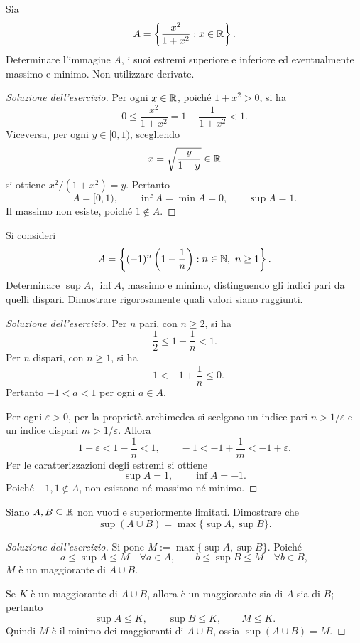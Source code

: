 \begin{exercise}
\label{ex:fondamenti-estremi-immagine-razionale}
Sia
\[
  A=\left\{\frac{x^2}{1+x^2}:x\in\mathbb{R}\right\}.
\]
Determinare l'immagine $A$, i suoi estremi superiore e inferiore
ed eventualmente massimo e minimo. Non utilizzare derivate.
\end{exercise}
\begin{proof}[Soluzione dell'esercizio]
Per ogni $x\in\mathbb{R}$, poiché $1+x^2>0$, si ha
\[
  0\le\frac{x^2}{1+x^2}
    =1-\frac1{1+x^2}<1.
\]
Viceversa, per ogni $y\in[0,1)$, scegliendo
\[
  x=\sqrt{\frac{y}{1-y}}\in\mathbb{R}
\]
si ottiene $x^2/(1+x^2)=y$. Pertanto
\[
  A=[0,1),\qquad \inf A=\min A=0,\qquad \sup A=1.
\]
Il massimo non esiste, poiché $1\notin A$.
\end{proof}

\begin{exercise}
\label{ex:fondamenti-estremi-famiglia-alterna}
Si consideri
\[
  A=\left\{(-1)^n\left(1-\frac1n\right):
    n\in\mathbb{N},\ n\ge1\right\}.
\]
Determinare $\sup A$, $\inf A$, massimo e minimo,
distinguendo gli indici pari da quelli dispari.
Dimostrare rigorosamente quali valori siano raggiunti.
\end{exercise}
\begin{proof}[Soluzione dell'esercizio]
Per $n$ pari, con $n\ge2$, si ha
\[
  \frac12\le1-\frac1n<1.
\]
Per $n$ dispari, con $n\ge1$, si ha
\[
  -1<-1+\frac1n\le0.
\]
Pertanto $-1<a<1$ per ogni $a\in A$.

Per ogni $\varepsilon>0$, per la proprietà archimedea
si scelgono un indice pari $n>1/\varepsilon$
e un indice dispari $m>1/\varepsilon$. Allora
\[
  1-\varepsilon<1-\frac1n<1,
  \qquad
  -1<-1+\frac1m<-1+\varepsilon.
\]
Per le caratterizzazioni degli estremi si ottiene
\[
  \sup A=1,\qquad \inf A=-1.
\]
Poiché $-1,1\notin A$, non esistono né massimo né minimo.
\end{proof}

\begin{exercise}
\label{ex:fondamenti-sup-unione}
Siano $A,B\subseteq\mathbb{R}$ non vuoti e superiormente limitati.
Dimostrare che
\[
  \sup(A\cup B)=\max\{\sup A,\sup B\}.
\]
\end{exercise}
\begin{proof}[Soluzione dell'esercizio]
Si pone $M:=\max\{\sup A,\sup B\}$. Poiché
\[
  a\le\sup A\le M\quad\forall a\in A,
  \qquad
  b\le\sup B\le M\quad\forall b\in B,
\]
$M$ è un maggiorante di $A\cup B$.

Se $K$ è un maggiorante di $A\cup B$, allora è un
maggiorante sia di $A$ sia di $B$; pertanto
\[
  \sup A\le K,\qquad \sup B\le K,
  \qquad M\le K.
\]
Quindi $M$ è il minimo dei maggioranti di $A\cup B$,
ossia $\sup(A\cup B)=M$.
\end{proof}

